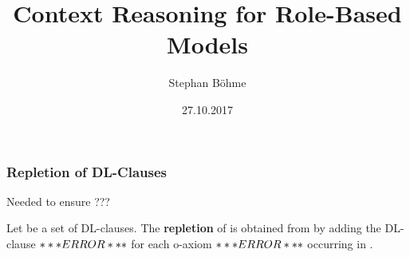 \documentclass[t,nototalpages,useheader=false]{tudbeamer}
\title{Context Reasoning for Role-Based Models}
\author{Stephan Böhme}
\date{27.10.2017}
\begin{document}



\slideJConHTIntro
\slideAlgorithm

\begin{frame}
  \frametitle*{Repletion of DL-Clauses}

  Needed to ensure ???
  
  \begin{definition}[Repletion]
  Let \Cmc be a set of DL-clauses. The \alert{\textbf{repletion}} of \Cmc is obtained from \Cmc by adding the
  DL-clause $\meta{\top \to \oax{\alpha}(x) \lor \oax{\lnot\alpha}(x)}$ for each o-axiom $\oax{\alpha}$
  occurring in \Cmc.
\end{definition}
\end{frame}

\slideJConHTEvaluation

\slideThankYou
\slideReferences
\end{document}
